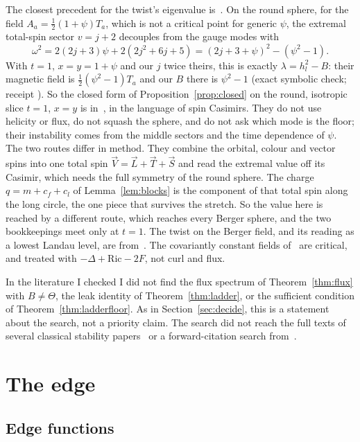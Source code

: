 \documentclass[11pt]{article}
\theoremstyle{definition}
\theoremstyle{remark}
\begin{document}
The closest precedent for the twist's eigenvalue is~\cite[eq.~(3.28)]{klc2021}. On the round sphere, for the
field $A_a=\tfrac12(1+\psi)T_a$, which is not a critical point for generic $\psi$, the extremal total-spin sector
$v=j+2$ decouples from the gauge modes with
\[
  \omega^2=2(2j+3)\psi+2(2j^2+6j+5)=(2j+3+\psi)^2-(\psi^2-1).
\]
With $t=1$, $x=y=1+\psi$ and our $j$ twice theirs, this is exactly $\lambda=h_l^2-B$: their magnetic field is
$\tfrac12(\psi^2-1)T_a$ and our $B$ there is $\psi^2-1$ (exact symbolic check; receipt ). So the closed
form of Proposition~\ref{prop:closed} on the round, isotropic slice $t=1$, $x=y$ is in~\cite{klc2021}, in the language
of spin Casimirs. They do not use helicity or flux, do not squash the sphere, and do not ask which mode is the floor;
their instability comes from the middle sectors and the time dependence of $\psi$. The two routes differ in
method. They combine the orbital, colour and vector spins into one total spin $\vec V=\vec L+\vec T+\vec S$ and read the
extremal value off its Casimir, which needs the full symmetry of the round sphere. The charge $q=m+c_f+c_l$ of
Lemma~\ref{lem:blocks} is the component of that total spin along the long circle, the one piece that survives the
stretch. So the value here is reached by a different route, which reaches every Berger sphere, and the two
bookkeepings meet only at $t=1$. The twist on the Berger field, and
its reading as a lowest Landau level, are from~\cite{davisfloor2026}. The covariantly constant fields
of~\cite{avramidicollopy2012} are critical, and treated with $-\Delta+\mathrm{Ric}-2F$, not curl and flux.

In the literature I checked I did not find the flux spectrum of Theorem~\ref{thm:flux} with $B\ne\Theta$, the leak
identity of Theorem~\ref{thm:ladder}, or the sufficient condition of Theorem~\ref{thm:ladderfloor}. As in
Section~\ref{sec:decide}, this is a statement about the search, not a priority claim. The search did not reach the
full texts of several classical stability papers~\cite{bl1981,kot1986,laquer1984} or a forward-citation search
from~\cite{klc2021}.

\section{The edge}\label{sec:edge}

\subsection{Edge functions}\label{subsec:edgefunctions}
\end{document}
